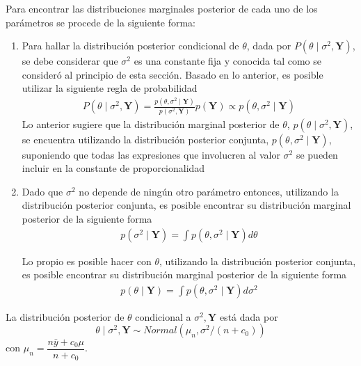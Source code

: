 \documentclass[10pt,openright]{book}\usepackage[]{graphicx}\usepackage[]{color}
\begin{document}
Para encontrar las distribuciones marginales posterior de cada uno de los par\'ametros se procede de la siguiente forma:
  
\begin{enumerate}
\item Para hallar la distribuci\'on posterior condicional de $\theta$, dada por $P(\theta \mid \sigma^2,\mathbf{Y})$, se debe considerar que $\sigma^2$ es una constante fija y conocida tal como se consider\'o al principio de esta secci\'on. Basado en lo anterior, es posible utilizar la siguiente regla de probabilidad
\begin{align*}
P(\theta \mid \sigma^2,\mathbf{Y})=\frac{p(\theta,\sigma^2 \mid \mathbf{Y})}{p(\sigma^2,\mathbf{Y})}p(\mathbf{Y})\propto p(\theta,\sigma^2 \mid \mathbf{Y})
\end{align*}
Lo anterior sugiere que la distribuci\'on marginal posterior de $\theta$, $p(\theta \mid \sigma^2,\mathbf{Y})$, se encuentra utilizando la distribuci\'on posterior conjunta, $p(\theta,\sigma^2 \mid \mathbf{Y})$, suponiendo que todas las expresiones que involucren al valor $\sigma^2$ se pueden incluir en la constante de proporcionalidad
\item Dado que $\sigma^2$ no depende de ning\'un otro par\'ametro entonces, utilizando la distribuci\'on posterior conjunta, es posible encontrar su distribuci\'on marginal posterior de la siguiente forma
\begin{align*}
p(\sigma^2 \mid \mathbf{Y})=\int p(\theta,\sigma^2 \mid \mathbf{Y}) d\theta
\end{align*}

Lo propio es posible hacer con $\theta$, utilizando la distribuci\'on posterior conjunta, es posible encontrar su distribuci\'on marginal posterior de la siguiente forma
\begin{align*}
p(\theta \mid \mathbf{Y})=\int p(\theta,\sigma^2 \mid \mathbf{Y}) d\sigma^2
\end{align*}
\end{enumerate}

\begin{Res}
La distribuci\'on posterior de $\theta$ condicional a $\sigma^2,\mathbf{Y}$ est\'a dada por
\begin{equation*}
\theta \mid \sigma^2,\mathbf{Y} \sim Normal(\mu_n,\sigma^2/(n+c_0))
\end{equation*}
con $\mu_n=\dfrac{n\bar{y}+c_0\mu}{n+c_0}$.
\end{Res}
\end{document}
